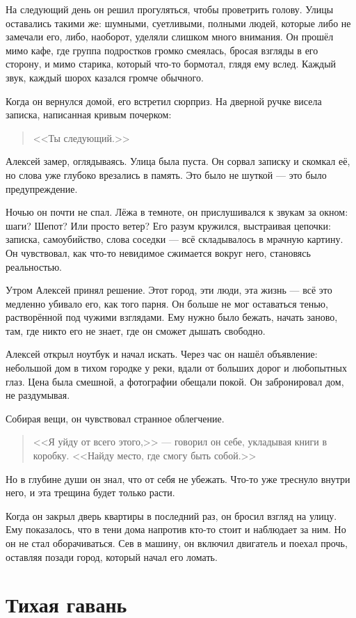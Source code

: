 \documentclass[12pt,a4paper]{book}
\begin{document}
На следующий день он решил прогуляться, чтобы проветрить голову. Улицы оставались такими же: шумными, суетливыми, полными людей, которые либо не замечали его, либо, наоборот, уделяли слишком много внимания. Он прошёл мимо кафе, где группа подростков громко смеялась, бросая взгляды в его сторону, и мимо старика, который что-то бормотал, глядя ему вслед. Каждый звук, каждый шорох казался громче обычного.

Когда он вернулся домой, его встретил сюрприз. На дверной ручке висела записка, написанная кривым почерком:
\begin{quote}
<<Ты следующий.>>
\end{quote}
Алексей замер, оглядываясь. Улица была пуста. Он сорвал записку и скомкал её, но слова уже глубоко врезались в память. Это было не шуткой --- это было предупреждение.

Ночью он почти не спал. Лёжа в темноте, он прислушивался к звукам за окном: шаги? Шепот? Или просто ветер? Его разум кружился, выстраивая цепочки: записка, самоубийство, слова соседки --- всё складывалось в мрачную картину. Он чувствовал, как что-то невидимое сжимается вокруг него, становясь реальностью.

Утром Алексей принял решение. Этот город, эти люди, эта жизнь --- всё это медленно убивало его, как того парня. Он больше не мог оставаться тенью, растворённой под чужими взглядами. Ему нужно было бежать, начать заново, там, где никто его не знает, где он сможет дышать свободно.

Алексей открыл ноутбук и начал искать. Через час он нашёл объявление: небольшой дом в тихом городке у реки, вдали от больших дорог и любопытных глаз. Цена была смешной, а фотографии обещали покой. Он забронировал дом, не раздумывая.

Собирая вещи, он чувствовал странное облегчение.
\begin{quote}
<<Я уйду от всего этого,>> --- говорил он себе, укладывая книги в коробку. <<Найду место, где смогу быть собой.>>
\end{quote}
Но в глубине души он знал, что от себя не убежать. Что-то уже треснуло внутри него, и эта трещина будет только расти.

Когда он закрыл дверь квартиры в последний раз, он бросил взгляд на улицу. Ему показалось, что в тени дома напротив кто-то стоит и наблюдает за ним. Но он не стал оборачиваться. Сев в машину, он включил двигатель и поехал прочь, оставляя позади город, который начал его ломать.

\chapter{Тихая гавань}
\end{document}
